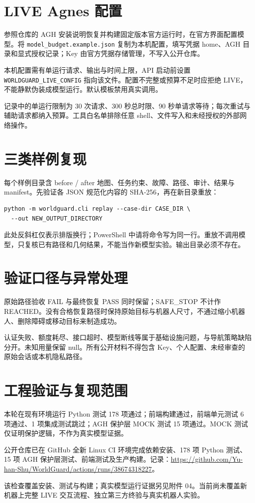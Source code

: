 \documentclass[UTF8,10pt,a4paper]{ctexart}
\begin{document}
\section{LIVE Agnes 配置}
参照仓库的 AGH 安装说明恢复并构建固定版本官方运行时，在官方界面配置模型。将 \nolinkurl{model_budget.example.json} 复制为本机配置，填写凭据 home、AGH 目录和显式授权记录；Key 由官方凭据存储管理，不写入公开仓库。

本机配置需有单运行请求、输出与时间上限，API 启动前设置 \nolinkurl{WORLDGUARD_LIVE_CONFIG} 指向该文件。配置不完整或预算不足时应拒绝 LIVE，不能静默伪装成模型运行。默认模板禁用真实调用。

记录中的单运行限制为 30 次请求、300 秒总时限、90 秒单请求等待；每次重试与辅助请求都纳入预算。工具白名单排除任意 shell、文件写入和未经授权的外部网络操作。
\section{三类样例复现}
每个样例目录含 before / after 地图、任务约束、故障、路径、审计、结果与 manifest。先验证各 JSON 规范化内容的 SHA-256，再在新目录重放：
\begin{verbatim}
python -m worldguard.cli replay --case-dir CASE_DIR \
  --out NEW_OUTPUT_DIRECTORY
\end{verbatim}
此处反斜杠仅表示排版换行；PowerShell 中请将命令写为同一行。重放不调用模型，只复核已有路径和几何结果，不能当作新模型实验。输出目录必须不存在。
\section{验证口径与异常处理}
原始路径验收 FAIL 与最终恢复 PASS 同时保留；SAFE\_STOP 不计作 REACHED。没有合格恢复路径时保持原始目标与机器人尺寸，不通过缩小机器人、删除障碍或移动目标来制造成功。

认证失败、额度耗尽、接口超时、模型断线等属于基础设施问题，与导航策略缺陷分开。未知用量保留 null。所有公开材料不得包含 Key、个人配置、未经审查的原始会话或本机隐私路径。
\section{工程验证与复现范围}
本轮在现有环境运行 Python 测试 178 项通过；前端构建通过，前端单元测试 6 项通过、1 项集成测试跳过；AGH 保护层 MOCK 测试 15 项通过。MOCK 测试仅证明保护逻辑，不作为真实模型证据。

公开仓库已在 GitHub 全新 Linux CI 环境完成依赖安装、178 项 Python 测试、15 项 AGH 保护层测试、前端测试及生产构建。记录：\url{https://github.com/Yu-han-Shu/WorldGuard/actions/runs/38674318227}。

该检查覆盖安装、测试与构建；真实模型运行证据另见附件 04。当前尚未覆盖新机器上完整 LIVE 交互流程、独立第三方终验与真实机器人实验。
\end{document}

